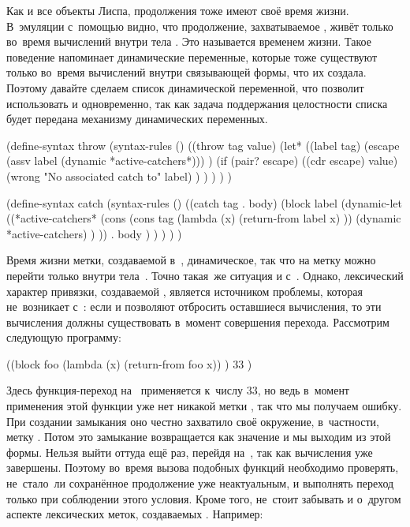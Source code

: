 Как и все объекты Лиспа, продолжения тоже имеют своё время жизни. В~эмуляции
 с~помощью  видно, что продолжение, захватываемое
, живёт только во~время вычислений внутри тела . Это
называется  временем жизни. Такое поведение напоминает
динамические переменные, которые тоже существуют только во~время вычислений
внутри связывающей формы, что их создала. Поэтому давайте сделаем список
 динамической переменной, что позволит использовать
 и  одновременно, так как задача поддержания целостности
списка будет передана механизму динамических переменных.

\begin{code:lisp}
(define-syntax throw
  (syntax-rules ()
    ((throw tag value)
     (let* ((label tag)
            (escape (assv label (dynamic *active-catchers*))) )
       (if (pair? escape)
           ((cdr escape) value)
           (wrong "No associated catch to" label) ) ) ) ) )

(define-syntax catch
  (syntax-rules ()
    ((catch tag . body)
     (block label
       (dynamic-let ((*active-catchers*
                      (cons (cons tag (lambda (x)
                                        (return-from label x) ))
                            (dynamic *active-catchers) ) ))
        . body ) ) ) ) )
\end{code:lisp}

Время жизни метки, создаваемой  в~{\CommonLisp}, динамическое, так что
на метку можно перейти только внутри тела~. Точно такая~же ситуация
и с~. Однако, лексический характер привязки, создаваемой ,
является источником проблемы, которая не~возникает с~: если 
и  позволяют отбросить оставшиеся вычисления, то эти вычисления
должны существовать в~момент совершения перехода. Рассмотрим следующую
программу:

\begin{code:lisp}
((block foo
   (lambda (x) (return-from foo x)) )
 33 )
\end{code:lisp}

Здесь функция-переход на~ применяется к~числу 33, но ведь в~момент
применения этой функции уже нет никакой метки , так что мы получаем
ошибку. При создании замыкания оно честно захватило своё окружение, в~частности,
метку . Потом это замыкание возвращается как значение  и мы
выходим из этой формы. Нельзя выйти оттуда ещё раз, перейдя на~, так как
вычисления уже завершены. Поэтому во~время вызова подобных функций необходимо
проверять, не~стало~ли сохранённое продолжение уже неактуальным, и выполнять
переход только при соблюдении этого условия. Кроме того, не~стоит забывать и
о~другом аспекте лексических меток, создаваемых . Например:

